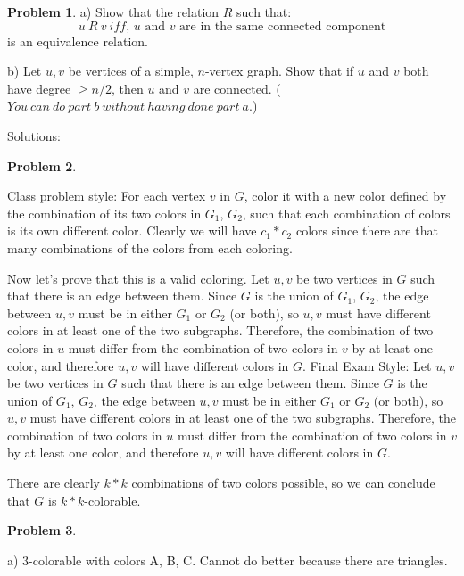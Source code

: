 \documentclass{amsart}
\theoremstyle{definition}
\newtheorem{problem}{Problem}
\theoremstyle{remark}
\begin{document}
\begin{problem}
a) Show that the relation $R$ such that: 
\[
u\ R\ v\ \text{$iff$, $u$ and $v$ are in the same connected component}
\]
is an equivalence relation.

b) Let $u,v$ be vertices of a simple, $n$-vertex graph.  Show that if
$u$ and $v$ both have degree $\geq n/2$, then $u$ and $v$ are
connected.  ($You\ can\ do\ part\ b\ without\ having\ done\ part\ a.$)
\end{problem}

\newpage
Solutions:
\setcounter{problem}{0}
\begin{problem}
\end{problem}
Class problem style: For each vertex $v$ in $G$, color it with a new
color defined by the combination of its two colors in $G_1$, $G_2$,
such that each combination of colors is its own different color.
Clearly we will have $c_1 * c_2$ colors since there are that many
combinations of the colors from each coloring.

Now let's prove that this is a valid coloring.  Let $u,v$ be two
vertices in $G$ such that there is an edge between them.  Since $G$ is
the union of $G_1$, $G_2$, the edge between $u,v$ must be in either
$G_1$ or $G_2$ (or both), so $u,v$ must have different colors in at
least one of the two subgraphs.  Therefore, the combination of two
colors in $u$ must differ from the combination of two colors in $v$ by
at least one color, and therefore $u,v$ will have different colors in
$G$.
\newline
\newline
Final Exam Style: Let $u,v$ be two vertices in $G$ such that there is
an edge between them.  Since $G$ is the union of $G_1$, $G_2$, the
edge between $u,v$ must be in either $G_1$ or $G_2$ (or both), so
$u,v$ must have different colors in at least one of the two subgraphs.
Therefore, the combination of two colors in $u$ must differ from the
combination of two colors in $v$ by at least one color, and therefore
$u,v$ will have different colors in $G$.

There are clearly $k*k$ combinations of two colors possible, so we can
conclude that $G$ is $k*k$-colorable.

\begin{problem}
\end{problem}
a) 3-colorable with colors A, B, C. Cannot do better because there are triangles.
\end{document}
